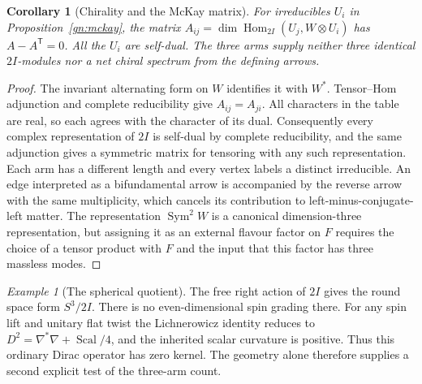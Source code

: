 \documentclass[aps,pra,onecolumn,superscriptaddress,nofootinbib,10pt]{revtex4-2}
\newtheorem{corollary}[theorem]{Corollary}
\theoremstyle{definition}
\theoremstyle{remark}
\newtheorem{example}[theorem]{Example}
\begin{document}
\begin{corollary}[Chirality and the McKay matrix]\label{gn:mckayobstruction}
For irreducibles $U_i$ in Proposition~\ref{gn:mckay}, the matrix
$A_{ij}=\dim\operatorname{Hom}_{2I}(U_j,W\otimes U_i)$ has
$A-A^{\mathsf T}=0$. All the $U_i$ are self-dual.
The three arms supply neither three identical $2I$-modules nor
a net chiral spectrum from the defining arrows.
\end{corollary}
\begin{proof}
The invariant alternating form on $W$ identifies it with $W^*$.
Tensor--Hom adjunction and complete reducibility give
$A_{ij}=A_{ji}$. All characters in the table are real, so each
agrees with the character of its dual. Consequently every complex representation
of $2I$ is self-dual by complete reducibility, and the same adjunction
gives a symmetric matrix for tensoring with any such representation.
Each arm has a different
length and every vertex labels a distinct irreducible. An edge
interpreted as a bifundamental arrow is accompanied by the reverse
arrow with the same multiplicity, which cancels its contribution
to left-minus-conjugate-left matter. The representation
$\operatorname{Sym}^2 W$ is a canonical dimension-three representation,
but assigning it as an external flavour factor on $F$ requires the
choice of a tensor product with $F$ and the input that this factor
has three massless modes.
\end{proof}

\begin{example}[The spherical quotient]\label{gn:quotient}
The free right action of $2I$ gives the round space form $S^3/2I$.
There is no even-dimensional spin grading there. For any spin lift
and unitary flat twist the Lichnerowicz identity reduces to
$D^2=\nabla^*\nabla+\operatorname{Scal}/4$, and the inherited scalar
curvature is positive. Thus this ordinary Dirac operator has zero
kernel. The geometry alone therefore supplies a second explicit
test of the three-arm count.
\end{example}
\end{document}
